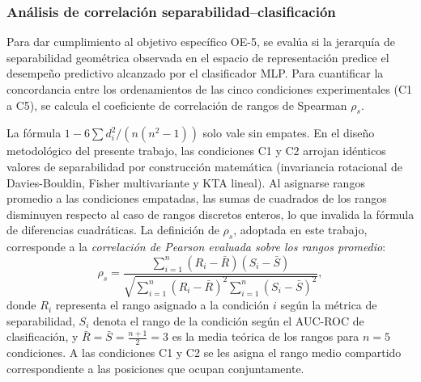 
\subsubsection{Análisis de correlación separabilidad--clasificación}

Para dar cumplimiento al objetivo específico OE-5, se evalúa si la jerarquía de separabilidad
geométrica observada en el espacio de representación predice el desempeño predictivo alcanzado
por el clasificador MLP. Para cuantificar la concordancia entre los ordenamientos de las
cinco condiciones experimentales (C1 a C5), se calcula el coeficiente de correlación de rangos
de Spearman $\rho_s$.

La fórmula $1-6\sum d_i^2/(n(n^2-1))$ solo vale sin empates. En el diseño metodológico del presente trabajo,
las condiciones C1 y C2 arrojan idénticos valores de separabilidad por construcción matemática
(invariancia rotacional de Davies-Bouldin, Fisher multivariante y KTA lineal). Al asignarse
rangos promedio a las condiciones empatadas, las sumas de cuadrados de los rangos disminuyen
respecto al caso de rangos discretos enteros, lo que invalida la fórmula de diferencias
cuadráticas. La definición de $\rho_s$, adoptada en este trabajo, corresponde a
la \textit{correlación de Pearson evaluada sobre los rangos promedio}:
\begin{equation}
  \rho_s = \frac{\sum_{i=1}^{n} (R_i - \bar{R})(S_i - \bar{S})}{\sqrt{\sum_{i=1}^{n} (R_i - \bar{R})^2 \sum_{i=1}^{n} (S_i - \bar{S})^2}},
  \label{eq:spearman}
\end{equation}
donde $R_i$ representa el rango asignado a la condición $i$ según la métrica de separabilidad, $S_i$
denota el rango de la condición según el AUC-ROC de clasificación, y $\bar{R} = \bar{S} = \frac{n+1}{2} = 3$
es la media teórica de los rangos para $n = 5$ condiciones. A las condiciones C1 y C2 se les asigna
el rango medio compartido correspondiente a las posiciones que ocupan conjuntamente.

